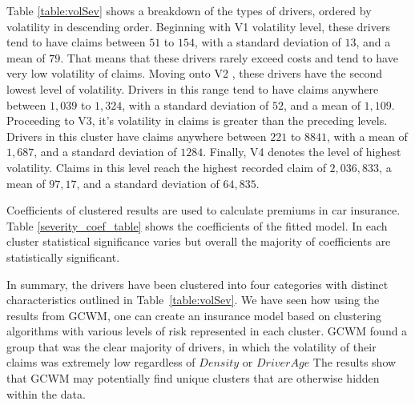 \documentclass[11pt,letterpaper]{article}
\numberwithin{equation}{section}
\numberwithin{equation}{section}
\numberwithin{equation}{section}
\begin{document}
Table \ref{table:volSev} shows a breakdown of the types of drivers, ordered by volatility in descending order. Beginning with V1 volatility level, these drivers tend to have claims between $51$ to $154$, with a standard deviation of $13$, and a mean of $79$. That means that these drivers rarely exceed costs and tend to have very low volatility of claims. Moving onto V2 , these drivers have the second lowest level of volatility. Drivers in this range tend to have claims anywhere between $1,039$ to $1,324$, with a standard deviation of $52$, and a mean of $1,109$.  Proceeding to V3, it's volatility in claims is greater than the preceding levels. Drivers in this cluster have claims anywhere between $221$ to $8841$, with a mean of $1,687$, and a standard deviation of $1284$. Finally, V4 denotes the level of highest volatility. Claims in this level  reach the highest recorded claim of $2,036,833$, a mean of $97,17$, and a standard deviation of $64,835$.

Coefficients of clustered results are used to calculate premiums in car insurance. Table \ref{severity_coef_table} shows the coefficients of the fitted model. In each cluster statistical significance varies but overall the majority of coefficients are statistically significant.

In summary, the drivers have been clustered into four categories with distinct characteristics outlined in Table~\ref{table:volSev}. We have seen how using the results from GCWM, one can create an insurance model based on clustering algorithms with various levels of risk represented in each cluster. GCWM found a group that was the clear majority of drivers, in which the volatility of their claims was extremely low regardless of $Density$ or $DriverAge$ The results show that GCWM may potentially find unique clusters that are otherwise hidden within the data.
\end{document}
